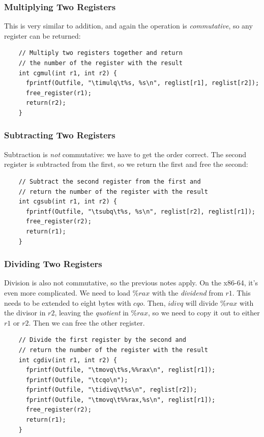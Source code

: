\documentclass[journal, onecolumn, 12pt]{IEEEtran}
\begin{document}
\subsubsection{Multiplying Two Registers}

This is very similar to addition, and again the operation is \textit{commutative}, so any register can be returned:

\begin{lstlisting}
    // Multiply two registers together and return
    // the number of the register with the result
    int cgmul(int r1, int r2) {
      fprintf(Outfile, "\timulq\t%s, %s\n", reglist[r1], reglist[r2]);
      free_register(r1);
      return(r2);
    }
\end{lstlisting}

\subsubsection{Subtracting Two Registers}

Subtraction is \textit{not} commutative: we have to get the order correct. The second register is subtracted from the first, so we return the first and free the second:

\begin{lstlisting}
    // Subtract the second register from the first and
    // return the number of the register with the result
    int cgsub(int r1, int r2) {
      fprintf(Outfile, "\tsubq\t%s, %s\n", reglist[r2], reglist[r1]);
      free_register(r2);
      return(r1);
    }
\end{lstlisting}

\subsubsection{Dividing Two Registers}

Division is also not commutative, so the previous notes apply. On the x86-64, it's even more complicated. We need to load $\%rax$ with the \textit{dividend} from $r1$. This needs to be extended to eight bytes with $cqo$. Then, $idivq$ will divide $\%rax$ with the divisor in $r2$, leaving the \textit{quotient} in $\%rax$, so we need to copy it out to either $r1$ or $r2$. Then we can free the other register.

\begin{lstlisting}
    // Divide the first register by the second and
    // return the number of the register with the result
    int cgdiv(int r1, int r2) {
      fprintf(Outfile, "\tmovq\t%s,%%rax\n", reglist[r1]);
      fprintf(Outfile, "\tcqo\n");
      fprintf(Outfile, "\tidivq\t%s\n", reglist[r2]);
      fprintf(Outfile, "\tmovq\t%%rax,%s\n", reglist[r1]);
      free_register(r2);
      return(r1);
    }
\end{lstlisting}
\end{document}
